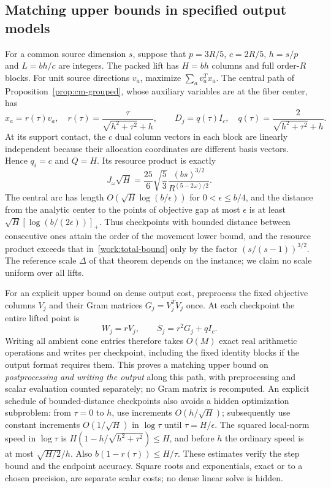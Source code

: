 \subsection{Matching upper bounds in specified output models}
For a common source dimension $s$, suppose that
$p=3R/5$, $c=2R/5$, $h=s/p$ and $L=bh/c$ are integers.
The packed lift has $H=bh$ columns and full order-$R$ blocks.
For unit source directions $v_a$, maximize $\sum_av_a^Tx_a$.
The central path of Proposition~\ref{prop:cm-grouped}, whose auxiliary
variables are at the fiber center, has
\[
 x_a=r(\tau)v_a,\quad
 r(\tau)=\frac{\tau}{\sqrt{h^2+\tau^2}+h},\qquad
 D_j=q(\tau)I_c,
 \quad q(\tau)=\frac{2}{\sqrt{h^2+\tau^2}+h}.
\]
At its support contact, the $c$ dual column vectors in each block are
linearly independent because their allocation coordinates are different
basis vectors. Hence $q_i=c$ and $Q=H$. Its resource product is exactly
\begin{equation}\label{work:matching-product}
 J_\omega\sqrt H=\frac{25}{6}\sqrt{\frac53}
                 \frac{(bs)^{3/2}}{R^{(5-2\omega)/2}}.
\end{equation}
The central arc has length $O(\sqrt H\log(b/\epsilon))$ for
$0<\epsilon\leq b/4$, and the distance from the analytic center to the
points of objective gap at most $\epsilon$ is at least
$\sqrt H[\log(b/(2\epsilon))]_+$. Thus checkpoints with bounded distance between consecutive ones
attain the order of the movement lower bound, and the resource product
exceeds that in~\eqref{work:total-bound} only by the factor
$(s/(s-1))^{3/2}$. The reference scale $\Delta$ of that theorem depends
on the instance; we claim no scale uniform over all lifts.

For an explicit upper bound on dense output cost, preprocess the
fixed objective columns $V_j$ and their Gram matrices $G_j=V_j^TV_j$
once. At each checkpoint the entire lifted point is
\[
 W_j=rV_j,\qquad S_j=r^2G_j+qI_c.
\]
Writing all ambient cone entries therefore takes $O(M)$ exact real
arithmetic operations and writes per checkpoint, including the fixed
identity blocks if the output format requires them. This proves a
matching upper bound on \emph{postprocessing and writing the output}
along this path, with preprocessing and scalar evaluation counted
separately; no Gram matrix is recomputed. An explicit schedule of
bounded-distance checkpoints also avoids a hidden optimization
subproblem:
from $\tau=0$ to $h$, use increments $O(h/\sqrt H)$; subsequently use
constant increments $O(1/\sqrt H)$ in $\log\tau$ until
$\tau=H/\epsilon$. The squared local-norm speed in $\log\tau$ is
$H(1-h/\sqrt{h^2+\tau^2})\leq H$, and before $h$ the ordinary speed
is at most $\sqrt{H/2}/h$. Also $b(1-r(\tau))\leq H/\tau$.
These estimates verify the step bound and the endpoint accuracy. Square roots and exponentials,
exact or to a chosen precision, are separate scalar costs; no dense
linear solve is hidden.

